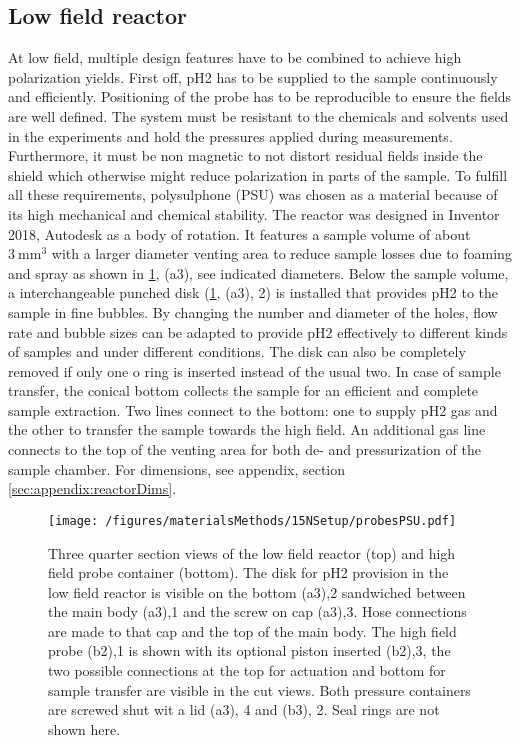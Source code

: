         \subsection{Low field reactor}
        \label{sec:matMeth:lowFieldReactor}
        At low field, multiple design features have to be combined to achieve high polarization yields.  First off, pH2 has to be supplied to the sample continuously and efficiently. Positioning of the probe has to be reproducible to ensure the fields are well defined.  The system must be resistant to the chemicals and solvents used in the experiments and hold the pressures applied during measurements.  Furthermore, it must be non magnetic to not distort residual fields inside the shield which otherwise might reduce polarization in parts of the sample. To fulfill all these requirements, polysulphone (PSU) was chosen as a material because of its high mechanical and chemical stability.  The reactor was designed in Inventor 2018, Autodesk as a body of rotation. It features a sample volume of about $\SI{3}{\mm\cubed}$ with a larger diameter venting area to reduce sample losses due to foaming and spray as shown in \ref{figure:materialsMethods:probesPSU}, (a3), see indicated diameters. Below the sample volume, a interchangeable punched disk (\ref{figure:materialsMethods:probesPSU}, (a3), 2) is installed that provides pH2 to the sample in fine bubbles. By changing the number and diameter of the holes, flow rate and bubble sizes can be adapted to provide pH2 effectively to different kinds of samples and under different conditions. The disk can also be completely removed if only one o ring is inserted instead of the usual two. In case of sample transfer, the conical bottom collects the sample for an efficient and complete sample extraction.  Two lines connect to the bottom: one to supply pH2 gas and the other to transfer the sample towards the high field.  An additional gas line connects to the top of the venting area for both de- and pressurization of the sample chamber.
        For dimensions, see appendix, section \ref{sec:appendix:reactorDims}.
            \begin{figure}
                \centering
                \texttt{[image: /figures/materialsMethods/15NSetup/probesPSU.pdf]}
                \caption[Reactor gemometry]{Three quarter section views of the low field reactor (top) and high field probe container (bottom). The disk for pH2 provision in the low field reactor is visible on the bottom (a3),2 sandwiched between the main body (a3),1 and the screw on cap (a3),3.  Hose connections are made to that cap and the top of the main body. The high field probe (b2),1 is shown with its optional piston inserted (b2),3, the two possible connections at the top for actuation and bottom for sample transfer are visible in the cut views. Both pressure containers are screwed shut wit a lid (a3), 4 and (b3), 2. Seal rings are not shown here.}
                \label{figure:materialsMethods:probesPSU}
            \end{figure}
